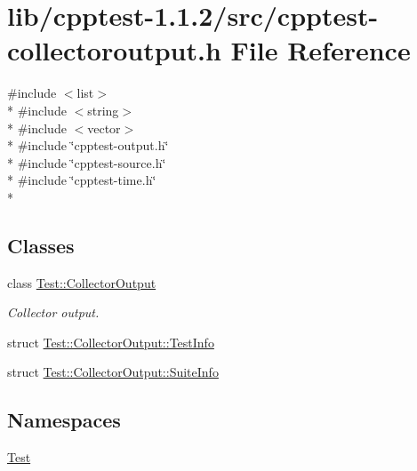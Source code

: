 \hypertarget{cpptest-collectoroutput_8h}{}\section{lib/cpptest-\/1.1.2/src/cpptest-\/collectoroutput.h File Reference}
\label{cpptest-collectoroutput_8h}
{\ttfamily \#include $<$list$>$}\\*
{\ttfamily \#include $<$string$>$}\\*
{\ttfamily \#include $<$vector$>$}\\*
{\ttfamily \#include \char`\"{}cpptest-\/output.\+h\char`\"{}}\\*
{\ttfamily \#include \char`\"{}cpptest-\/source.\+h\char`\"{}}\\*
{\ttfamily \#include \char`\"{}cpptest-\/time.\+h\char`\"{}}\\*
\subsection*{Classes}
\begin{DoxyCompactItemize}
\item 
class \hyperlink{class_test_1_1_collector_output}{Test\+::\+Collector\+Output}
\begin{DoxyCompactList}\small\item\em Collector output. \end{DoxyCompactList}\item 
struct \hyperlink{struct_test_1_1_collector_output_1_1_test_info}{Test\+::\+Collector\+Output\+::\+Test\+Info}
\item 
struct \hyperlink{struct_test_1_1_collector_output_1_1_suite_info}{Test\+::\+Collector\+Output\+::\+Suite\+Info}
\end{DoxyCompactItemize}
\subsection*{Namespaces}
\begin{DoxyCompactItemize}
\item 
 \hyperlink{namespace_test}{Test}
\end{DoxyCompactItemize}
